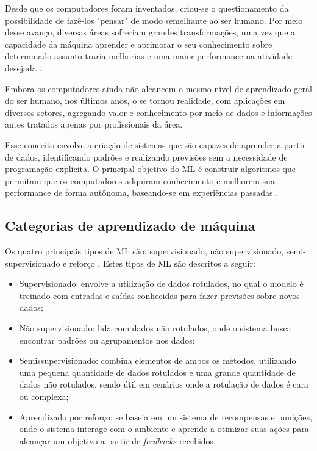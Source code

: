 Desde que os computadores foram inventados, criou-se o questionamento da possibilidade de fazê-los "pensar" de modo semelhante ao ser humano. Por meio desse avanço, diversas áreas sofreriam grandes transformações, uma vez que a capacidade da máquina aprender e aprimorar o seu conhecimento sobre determinado assunto traria melhorias e uma maior performance na atividade desejada \cite{carbonell1983}.

Embora os computadores ainda não alcancem o mesmo nível de aprendizado geral do ser humano, nos últimos anos, o  se tornou realidade, com aplicações em diversos setores, agregando valor e conhecimento por meio de dados e informações antes tratados apenas por profissionais da área.

Esse conceito envolve a criação de sistemas que são capazes de aprender a partir de dados, identificando padrões e realizando previsões sem a necessidade de programação explícita. O principal objetivo do \gls{ML} é construir algoritmos que permitam que os computadores adquiram conhecimento e melhorem sua performance de forma autônoma, baseando-se em experiências passadas \cite{carbonell1983}.

\subsection{Categorias de aprendizado de máquina}

Os quatro principais tipos de \gls{ML} são: supervisionado, não supervisionado, semi-supervisionado e reforço \cite{saravanan2018}. Estes tipos de \gls{ML} são descritos a seguir:

\begin{itemize}
    \item Supervisionado: envolve a utilização de dados rotulados, no qual o modelo é treinado com entradas e saídas conhecidas para fazer previsões sobre novos dados;
    \item Não supervisionado: lida com dados não rotulados, onde o sistema busca encontrar padrões ou agrupamentos nos dados;
    \item Semissupervisionado: combina elementos de ambos os métodos, utilizando uma pequena quantidade de dados rotulados e uma grande quantidade de dados não rotulados, sendo útil em cenários onde a rotulação de dados é cara ou complexa;
    \item Aprendizado por reforço: se baseia em um sistema de recompensas e punições, onde o sistema interage com o ambiente e aprende a otimizar suas ações para alcançar um objetivo a partir de \textit{feedbacks} recebidos.
\end{itemize}

